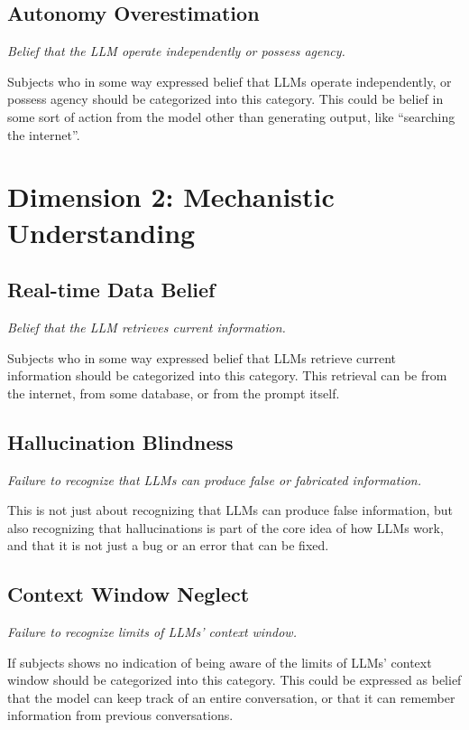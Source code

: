 \subsection*{Autonomy Overestimation}

\textit{Belief that the LLM operate independently or possess agency.}

Subjects who in some way expressed belief that LLMs operate independently, or possess agency should be categorized into this category. This could be belief in some sort of action from the model other than generating output, like ``searching the internet''.

\section*{Dimension 2: Mechanistic Understanding}

\subsection*{Real-time Data Belief}

\textit{Belief that the LLM retrieves current information.}

Subjects who in some way expressed belief that LLMs retrieve current information should be categorized into this category. This retrieval can be from the internet, from some database, or from the prompt itself.

\subsection*{Hallucination Blindness}

\textit{Failure to recognize that LLMs can produce false or fabricated information.}

This is not just about recognizing that LLMs can produce false information, but also recognizing that hallucinations is part of the core idea of how LLMs work, and that it is not just a bug or an error that can be fixed.

\subsection*{Context Window Neglect}

\textit{Failure to recognize limits of LLMs' context window.}

If subjects shows no indication of being aware of the limits of LLMs' context window should be categorized into this category. This could be expressed as belief that the model can keep track of an entire conversation, or that it can remember information from previous conversations.

